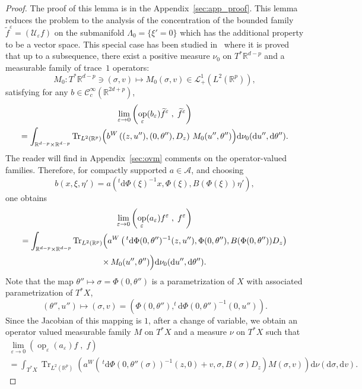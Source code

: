 \documentclass[10pt]{amsart}
\theoremstyle{definition}
\DeclareMathOperator{\Trr}{Tr}
\DeclareMathOperator{\op}{op}
\newcommand*\R{{\mathbb R}}
\newcommand*\eps{\varepsilon}
\numberwithin{equation}{section}
\newcommand*{\dd}{\mathrm{d}}
\newcommand*{\dv}{\dd v}
\newcommand*{\du}{\dd u}
\newcommand*{\dnu}{\dd \nu}
\newcommand*{\dtheta}{\dd \theta}
\newcommand*{\dsigma}{\dd \sigma}
\newcommand*{\dPhi}{\dd \Phi} %
\begin{document}
\begin{proof}
The proof of this lemma is in the Appendix~\ref{sec:app_proof}. This lemma reduces the problem to the analysis of the concentration of the bounded family $\widetilde f^\eps =({\mathcal U}_\eps f)$ on the submanifold $\Lambda_0=\{\xi'=0\}$ which has the additional property to be a vector space. This special case has been studied in~\cite[p.~96--97, Proposition~2]{CFMProc} where it is proved that up to a subsequence, there exist a positive measure $\nu_0$ on $T^*\R^{d-p}$ and a measurable family of trace~$1$ operators:
\[
M_0:T^*\R^{d-p}\ni(\sigma,v)\longmapsto M_0(\sigma,v)\in \mathcal{L}^1_+(L^2(\R^p)),
\]
satisfying for any $b\in{\mathcal C}_c^\infty(\R^{2d+p})$,
\begin{multline*}	
 \lim_{\eps\rightarrow 0} \left(\op_\eps(b_\eps)\widetilde f^\eps\;,\;\widetilde f^\eps\right)
\\=\int_{\R^{d-p}\times\R^{d-p}} {\Trr}_{L^2(\R^p)} \Bigl(b^W\left((z,u''),(0,\theta''), D_z\right)
\, M_0(u'',\theta'')\Bigr)\dnu_0(\du'',\dtheta'').
\end{multline*}
The reader will find in Appendix~\ref{sec:ovm} comments on the operator-valued families. Therefore, for compactly supported $a\in{\mathcal A}$, and choosing
\[
b(x,\xi,\eta')= a\left(^t \dPhi (\xi)^{-1} x,\Phi(\xi),B\left(\Phi(\xi)\right)\eta'\right),
\]
one obtains
\begin{multline*}
\lim_{\eps\rightarrow 0} \left(\op_\eps(a_\eps)f^\eps\;,\;f^\eps\right)\\
=\int_{\R^{d-p}\times\R^{d-p}} {\Trr}_{L^2(\R^p)} \Bigl(a^W\left(\,^t \dPhi (0,\theta'')^{-1}(z,u''), \Phi(0,\theta''),B(\Phi(0,\theta'')) D_z\right)
\\ \times\, M_0(u'',\theta'')\Bigr)\dnu_0(\du'',\dtheta'').
\end{multline*}
Note that the map $\theta''\mapsto \sigma =\Phi(0,\theta'')$ is a parametrization of $X$ with associated parametrization of $T^*X$,
\[
(\theta'',u'')\mapsto (\sigma,v)=\left(\Phi(0,\theta''), ^t \dPhi (0,\theta'')^{-1}(0,u'')\right).
\]
Since the Jacobian of this mapping is $1$, after a change of variable, we obtain an operator valued measurable family $M$ on $T^*X$ and a measure $\nu$ on $T^*X$ such that
\begin{multline*}
 \lim_{\eps\rightarrow 0}\left(\op_\eps(a_\eps)f\;,\;f\right) \\
 = \int_{T^*X}{\Trr}_{L^2(\R^p)} \left(a^W\left(\,^t \dPhi (0,\theta''(\sigma))^{-1}(z,0) +v, \sigma,B(\sigma) D_ z\right) M(\sigma,v)\right)\dnu(\dsigma,\dv).
\end{multline*}

\end{proof}
\end{document}
